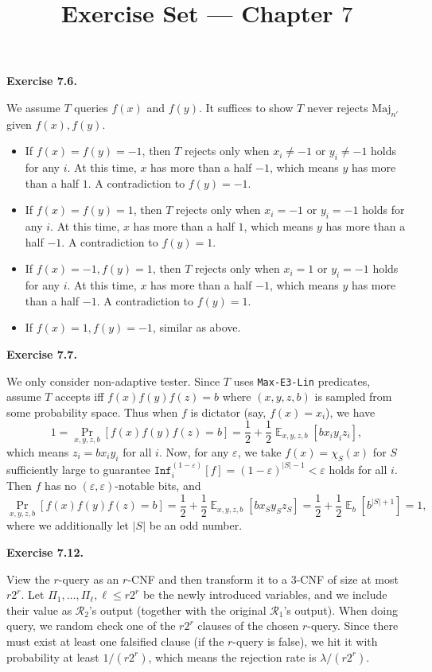 \documentclass[a4paper]{article}
\title{Exercise Set --- Chapter $7$}
\date{}
\newenvironment{exercise}[1]{
	\par
	\noindent\textbf{Exercise #1.}\quad
}{
	\par
	\bigskip
}
\DeclareMathOperator*{\E}{\mathbb E}
\newcommand{\eps}{\varepsilon}
\newcommand{\sbra}[1]{{\left[ #1 \right]}}
\newcommand{\Rcal}{\mathcal{R}}
\newcommand{\Inf}{\mathtt{Inf}}
\begin{document}
\maketitle

\begin{exercise}{7.6}
    We assume $T$ queries $f(x)$ and $f(y)$. It suffices to show $T$ never rejects $\text{Maj}_{n'}$ given $f(x),f(y)$.
    \begin{itemize}
        \item If $f(x)=f(y)=-1$, then $T$ rejects only when $x_i\neq-1$ or $y_i\neq-1$ holds for any $i$.
            At this time, $x$ has more than a half $-1$, which means $y$ has more than a half $1$. A contradiction to $f(y)=-1$.
        \item If $f(x)=f(y)=1$, then $T$ rejects only when $x_i=-1$ or $y_i=-1$ holds for any $i$.
            At this time, $x$ has more than a half $1$, which means $y$ has more than a half $-1$. A contradiction to $f(y)=1$.
        \item If $f(x)=-1, f(y)=1$, then $T$ rejects only when $x_i=1$ or $y_i=-1$ holds for any $i$.
            At this time, $x$ has more than a half $-1$, which means $y$ has more than a half $-1$. A contradiction to $f(y)=1$.
        \item If $f(x)=1, f(y)=-1$, similar as above.
    \end{itemize}
\end{exercise}

\begin{exercise}{7.7}
    We only consider non-adaptive tester. Since $T$ uses \texttt{Max-E3-Lin} predicates, 
    assume $T$ accepts iff $f(x)f(y)f(z)=b$ where $(x,y,z,b)$ is sampled from some probability space.
    Thus when $f$ is dictator (say, $f(x)=x_i$), we have
    $$
    1=\Pr_{x,y,z,b}\sbra{f(x)f(y)f(z)=b}=\frac12+\frac12\E_{x,y,z,b}\sbra{bx_iy_iz_i},
    $$
    which means $z_i=bx_iy_i$ for all $i$.
    Now, for any $\eps$, we take $f(x)=\chi_S(x)$ for $S$ sufficiently large to guarantee $\Inf_i^{(1-\eps)}[f]=(1-\eps)^{|S|-1}<\eps$ holds for all $i$. Then $f$ has no $(\eps,\eps)$-notable bits, and
    $$
    \Pr_{x,y,z,b}\sbra{f(x)f(y)f(z)=b}=\frac12+\frac12\E_{x,y,z,b}\sbra{bx_Sy_Sz_S}
    =\frac12+\frac12\E_b\sbra{b^{|S|+1}}=1,
    $$
    where we additionally let $|S|$ be an odd number.
\end{exercise}

\begin{exercise}{7.12}
    View the $r$-query as an $r$-CNF and then transform it to a $3$-CNF of size at most $r2^r$. 
    Let $\Pi_1,\ldots,\Pi_\ell,\ell\leq r2^r$ be the newly introduced variables, 
    and we include their value as $\Rcal_2$'s output (together with the original $\Rcal_1$'s output).
    When doing query, we random check one of the $r2^r$ clauses of the chosen $r$-query.
    Since there must exist at least one falsified clause (if the $r$-query is false), we hit it with probability at least $1/(r2^r)$,
    which means the rejection rate is $\lambda/(r2^r)$.
\end{exercise}
\end{document}

